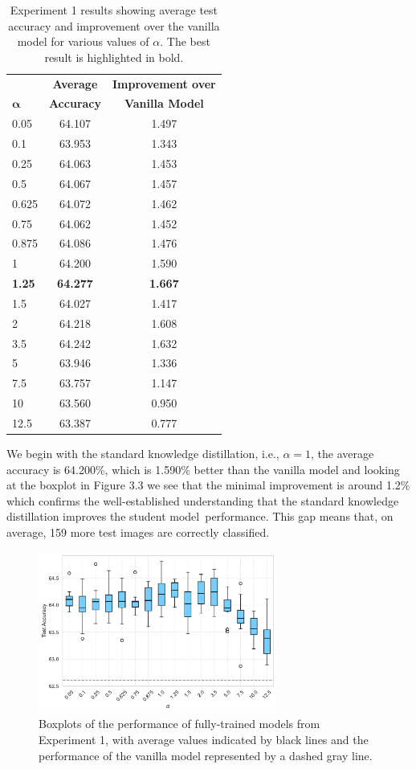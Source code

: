 \begin{table}[h]
	\centering
	\begin{tabular}{lcc}
		\toprule
		& \textbf{Average} & \textbf{Improvement over} \\
		$\boldsymbol{\alpha}$ & \textbf{Accuracy} & \textbf{Vanilla Model} \\ \midrule
		0.05 & 64.107 & 1.497 \\
		0.1 & 63.953 & 1.343\\
		0.25 & 64.063 & 1.453\\
		0.5 & 64.067 & 1.457\\
		0.625 & 64.072 & 1.462\\
		0.75 & 64.062 & 1.452\\
		0.875 & 64.086 & 1.476\\
		1 & 64.200 & 1.590 \\
		\bf{1.25} & \bf{64.277} & \bf{1.667} \\
		1.5 & 64.027 & 1.417 \\
		2 & 64.218 & 1.608\\
		3.5 & 64.242 & 1.632\\
		5 & 63.946 & 1.336\\
		7.5 & 63.757 & 1.147\\
		10 & 63.560 & 0.950\\
		12.5 & 63.387 & 0.777\\
		\bottomrule
	\end{tabular}
	\caption{Experiment 1 results showing average test accuracy and improvement over the vanilla model for various values of $\alpha$. The best result is highlighted in bold.}
	\label{tab:exp1_res}
\end{table}

We begin with the standard knowledge distillation, i.e., $\alpha = 1$, the average accuracy is 64.200\%, which is 1.590\% better than the vanilla model and looking at the boxplot in Figure 3.3 we see that the minimal improvement is around 1.2\% which confirms the well-established understanding that the standard knowledge distillation improves the student model performance. This gap means that, on average, 159 more test images are correctly classified.

\begin{figure}[h!]
	\centering
	\includegraphics[width=0.7\textwidth]{../img/exp1_box_220.pdf}
	\caption{Boxplots of the performance of fully-trained models from Experiment 1, with average values indicated by black lines and the performance of the vanilla model represented by a dashed gray line.}
	\label{fig:exp1_box_219}
\end{figure}

